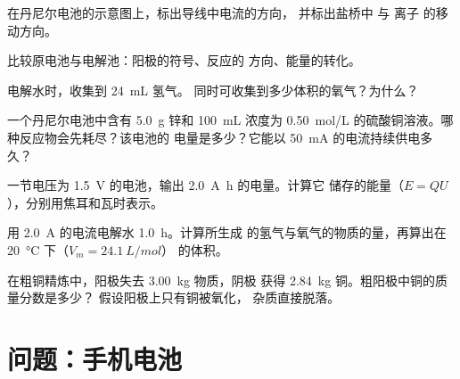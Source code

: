 \begin{exercise}[$\star\star$]\label{exo:g12:cells-and-electrolysis:9}
在丹尼尔电池的示意图上，标出导线中电流的方向，
并标出盐桥中  与  离子
的移动方向。
\end{exercise}

\begin{exercise}[$\star\star$]\label{exo:g12:cells-and-electrolysis:10}
比较原电池与电解池：阳极的符号、反应的
方向、能量的转化。
\end{exercise}

\begin{exercise}[$\star\star$]\label{exo:g12:cells-and-electrolysis:11}
电解水时，收集到 \qty{24}{mL} 氢气。
同时可收集到多少体积的氧气？为什么？
\end{exercise}

\begin{exercise}[$\star\star\star$]\label{exo:g12:cells-and-electrolysis:12}
一个丹尼尔电池中含有 \qty{5.0}{g} 锌和 \qty{100}{mL}
浓度为 \qty{0.50}{mol/L} 的硫酸铜溶液。哪种反应物会先耗尽？该电池的
电量是多少？它能以 \qty{50}{mA} 的电流持续供电多久？
\end{exercise}

\begin{exercise}[$\star\star\star$]\label{exo:g12:cells-and-electrolysis:13}
一节电压为 \qty{1.5}{V} 的电池，输出 \qty{2.0}{A.h} 的电量。计算它
储存的能量（$E = Q U$），分别用焦耳和瓦时表示。
\end{exercise}

\begin{exercise}[$\star\star\star$]\label{exo:g12:cells-and-electrolysis:14}
用 \qty{2.0}{A} 的电流电解水 \qty{1.0}{h}。计算所生成
的氢气与氧气的物质的量，再算出在 \qty{20}{\celsius} 下（$V_m = \qty{24.1}{L/mol}$）
的体积。
\end{exercise}

\begin{exercise}[$\star\star\star$]\label{exo:g12:cells-and-electrolysis:15}
在粗铜精炼中，阳极失去 \qty{3.00}{kg} 物质，阴极
获得 \qty{2.84}{kg} 铜。粗阳极中铜的质量分数是多少？
假设阳极上只有铜被氧化，
杂质直接脱落。
\end{exercise}

\section{问题：手机电池}

